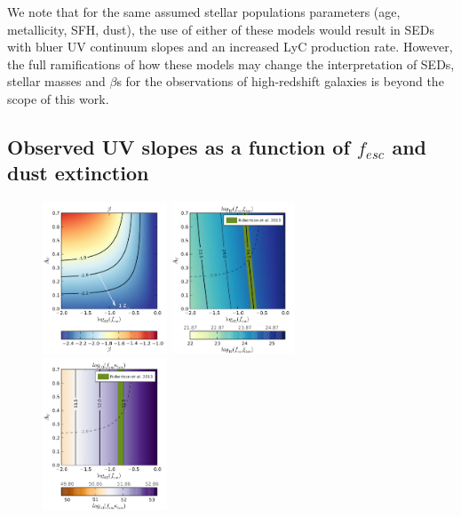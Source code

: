 We note that for the same assumed stellar populations parameters (age, metallicity, SFH, dust), the use of either of these models would result in SEDs with bluer UV continuum slopes and an increased LyC production rate. However, the full ramifications of how these models may change the interpretation of SEDs, stellar masses and $\beta$s for the observations of high-redshift galaxies is beyond the scope of this work. 

\subsection{Observed UV slopes as a function of $f_{esc}$ and dust extinction}\label{sec:slp}
\begin{figure}
\centering
  \includegraphics[width=0.33\textwidth]{plots/Fig5a.pdf}
  \includegraphics[width=0.33\textwidth]{plots/Fig5b.pdf}
  \includegraphics[width=0.33\textwidth]{plots/Fig5c.pdf}


\end{figure}
